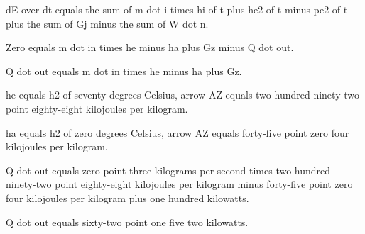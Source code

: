 dE over dt equals the sum of m dot i times hi of t plus he2 of t minus pe2 of t plus the sum of Gj minus the sum of W dot n. 

Zero equals m dot in times he minus ha plus Gz minus Q dot out. 

Q dot out equals m dot in times he minus ha plus Gz. 

he equals h2 of seventy degrees Celsius, arrow AZ equals two hundred ninety-two point eighty-eight kilojoules per kilogram. 

ha equals h2 of zero degrees Celsius, arrow AZ equals forty-five point zero four kilojoules per kilogram. 

Q dot out equals zero point three kilograms per second times two hundred ninety-two point eighty-eight kilojoules per kilogram minus forty-five point zero four kilojoules per kilogram plus one hundred kilowatts. 

Q dot out equals sixty-two point one five two kilowatts.